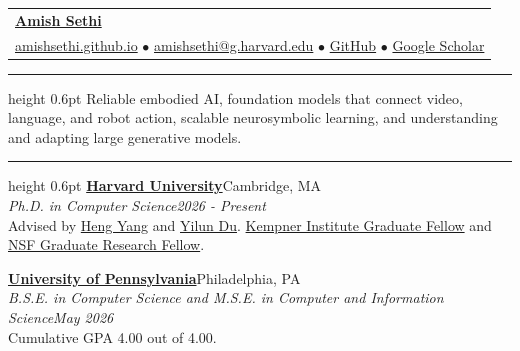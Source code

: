 \documentclass[letterpaper,11pt]{article}
\newcommand{\rsection}[1]{%
  \vspace{5pt}{\scshape\Large #1}\par\vspace{2pt}\hrule height 0.6pt\vspace{3pt}}
\newcommand{\linkhref}[2]{\textcolor{linkblue}{\href{#1}{#2}}}
\newcommand{\heading}[4]{\textbf{#1}\hfill #2\\\textit{\small #3}\hfill \textit{\small #4}}
\begin{document}
\begin{tabular}{@{}l}
  \textbf{\href{https://amishsethi.github.io}{\LARGE Amish Sethi}} \\[4pt]
  \linkhref{https://amishsethi.github.io}{amishsethi.github.io} \quad$\bullet$\quad
  \linkhref{mailto:amishsethi@g.harvard.edu}{amishsethi@g.harvard.edu} \quad$\bullet$\quad
  \linkhref{https://github.com/AmishSethi}{GitHub} \quad$\bullet$\quad
  \linkhref{https://scholar.google.com/citations?user=k7JSR2UAAAAJ}{Google Scholar}
\end{tabular}

\rsection{Research Interests}
Reliable embodied AI, foundation models that connect video, language, and robot action, scalable neurosymbolic learning, and understanding and adapting large generative models.

\rsection{Education}
\heading{\href{https://www.harvard.edu/}{Harvard University}}{Cambridge, MA}{Ph.D. in Computer Science}{2026 - Present}\\
{\small Advised by \linkhref{https://hankyang.seas.harvard.edu/}{Heng Yang} and \linkhref{https://yilundu.github.io/}{Yilun Du}. \linkhref{https://kempnerinstitute.harvard.edu/education/graduate-fellowship/}{Kempner Institute Graduate Fellow} and \linkhref{https://www.nsf.gov/funding/opportunities/grfp-nsf-graduate-research-fellowship-program}{NSF Graduate Research Fellow}.}

\vspace{3pt}
\heading{\href{https://www.upenn.edu/}{University of Pennsylvania}}{Philadelphia, PA}{B.S.E. in Computer Science and M.S.E. in Computer and Information Science}{May 2026}\\
{\small Cumulative GPA 4.00 out of 4.00.}
\end{document}
